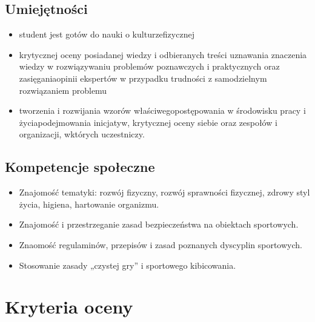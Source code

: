 \documentclass[12pt, a4paper]{article}
\begin{document}
\subsection*{Umiejętności}
\begin{itemize}
  \item student jest gotów do nauki o kulturzefizycznej
  \item krytycznej oceny posiadanej wiedzy i odbieranych treści uznawania znaczenia wiedzy w rozwiązywaniu problemów poznawczych i praktycznych oraz zasięganiaopinii ekspertów w przypadku trudności z samodzielnym rozwiązaniem problemu
  \item tworzenia i rozwijania wzorów właściwegopostępowania w środowisku pracy i życiapodejmowania inicjatyw, krytycznej oceny siebie oraz zespołów i organizacji, wktórych uczestniczy.
\end{itemize}

\subsection*{Kompetencje społeczne}
\begin{itemize}
  \item Znajomość tematyki: rozwój fizyczny, rozwój sprawności fizycznej, zdrowy styl życia, higiena, hartowanie organizmu.
  \item Znajomość i przestrzeganie zasad bezpieczeństwa na obiektach sportowych.
  \item Znaomość regulaminów, przepisów i zasad poznanych dyscyplin sportowych.
  \item Stosowanie zasady „czystej gry” i sportowego kibicowania.
\end{itemize}

\section{Kryteria oceny}
\end{document}
